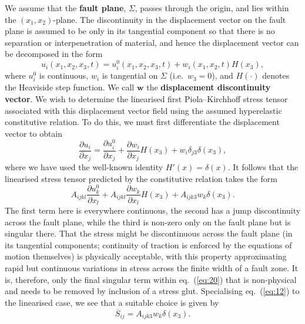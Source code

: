 We assume that the \textbf{fault plane}, $\Sigma$, passes through the origin, and lies within the $(x_1, x_2)$-plane. The discontinuity 
in the displacement vector on the fault plane is assumed to be only in its tangential component so that there is no separation or 
interpenetration of material, and hence the displacement vector can be decomposed in the form
\begin{equation}\label{eq:18}
u_{i}(x_1, x_2, x_3, t) = u_{i}^{0}(x_1, x_2, x_3, t) + w_{i}(x_1, x_2, t)H(x_3),
\end{equation}
where $u_i^0$ is continuous, $w_i$ is tangential on $\Sigma$ (i.e.\ $w_3=0$), and $H(\cdot)$ denotes the Heaviside step 
function. We call $\mathbf{w}$ the \textbf{displacement discontinuity vector}. 
We wish to determine the linearised first Piola--Kirchhoff stress tensor associated with this displacement vector 
field using the assumed hyperelastic constitutive relation. To do this, 
we must first differentiate the displacement vector to obtain
\begin{equation}\label{eq:19}
\frac{\partial u_{i}}{\partial x_{j}} = \frac{\partial u_{i}^{0}}{\partial x_{j}} + \frac{\partial w_{i}}{\partial x_{j}}H(x_3) + w_{i}\delta_{j3}\delta(x_3),
\end{equation}
where we have used the well-known identity $H'(x) = \delta(x)$. It follows that the linearised stress tensor predicted by the constitutive relation takes the form
\begin{equation}\label{eq:20}
A_{ijkl}\frac{\partial u_{k}^{0}}{\partial x_{l}} + A_{ijkl}\frac{\partial w_{k}}{\partial x_{l}}H(x_3) + A_{ijk3}w_{k}\delta(x_3).
\end{equation}
The first term here is everywhere continuous, the second has a jump discontinuity across the fault plane, while the third is non-zero only 
on the fault plane but is singular there. 
That the stress might be discontinuous across the fault plane (in its tangential components; continuity of traction is enforced by 
the equations of motion themselves) is physically acceptable, with this property approximating rapid but 
continuous variations in stress across the finite width of a fault zone. It is, 
therefore, only the final singular term within eq.~(\ref{eq:20}) that is non-physical and needs to be removed by inclusion of a stress 
glut. Specialising eq.~(\ref{eq:12}) to the linearised case, we see that a suitable choice is given by
\begin{equation}\label{eq:21}
\overline{S}_{ij} = A_{ijk3}w_{k}\delta(x_3).
\end{equation}
